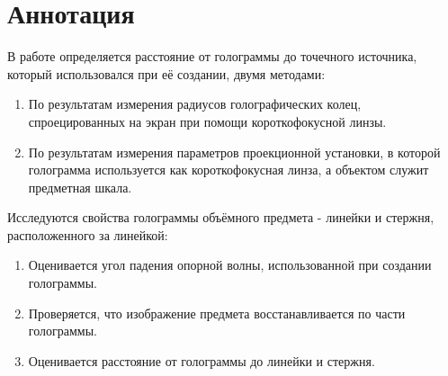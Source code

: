 \section*{Аннотация}

В работе определяется расстояние от голограммы до точечного источника, который использовался при её создании, двумя методами:
\begin{enumerate}
	\item По результатам измерения радиусов голографических колец, спроецированных на экран при помощи короткофокусной линзы.
	
	\item По результатам измерения параметров проекционной установки, в которой голограмма используется как короткофокусная линза, а объектом служит предметная шкала.
\end{enumerate}

Исследуются свойства голограммы объёмного предмета - линейки и стержня, расположенного за линейкой:
\begin{enumerate}
	\item Оценивается угол падения опорной волны, использованной при создании голограммы.
	
	\item Проверяется, что изображение предмета восстанавливается по части голограммы.
	
	\item Оценивается расстояние от голограммы до линейки и стержня.
\end{enumerate}